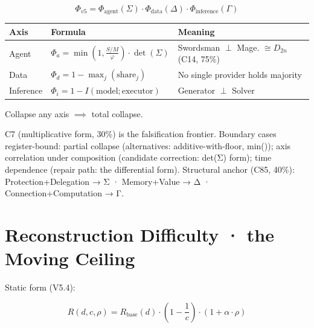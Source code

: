 \documentclass[
  11pt,
]{article}
\newcounter{none} %
\begin{document}
\[\Phi_{v5} = \Phi_{\text{agent}}(\Sigma) \cdot \Phi_{\text{data}}(\Delta) \cdot \Phi_{\text{inference}}(\Gamma)\]

{\def\LTcaptype{none} %
\begin{longtable}[]{@{}
  >{\raggedright\arraybackslash}p{}
  >{\raggedright\arraybackslash}p{}
  >{\raggedright\arraybackslash}p{}@{}}
\toprule\noalign{}
\begin{minipage}[b]{\linewidth}\raggedright
Axis
\end{minipage} & \begin{minipage}[b]{\linewidth}\raggedright
Formula
\end{minipage} & \begin{minipage}[b]{\linewidth}\raggedright
Meaning
\end{minipage} \\
\midrule\noalign{}
\endhead
\bottomrule\noalign{}
\endlastfoot
Agent & \(\Phi_a = \min(1, \frac{S/M}{\varphi}) \cdot \det(\Sigma)\) &
Swordsman \(\perp\) Mage. \(\cong D_{2n}\) (C14, 75\%) \\
Data & \(\Phi_d = 1 - \max_j(\text{share}_j)\) & No single provider
holds majority \\
Inference & \(\Phi_i = 1 - I(\text{model};\text{executor})\) & Generator
\(\perp\) Solver \\
\end{longtable}
}

Collapse any axis \(\implies\) total collapse.

C7 (multiplicative form, 30\%) is the falsification frontier. Boundary
cases register-bound: partial collapse (alternatives:
additive-with-floor, min()); axis correlation under composition
(candidate correction: det(Σ) form); time dependence (repair path: the
differential form). Structural anchor (C85, 40\%): Protection+Delegation
→ Σ · Memory+Value → Δ · Connection+Computation → Γ.

\section{Reconstruction Difficulty · the Moving
Ceiling}\label{reconstruction-difficulty-the-moving-ceiling}

Static form (V5.4):

\[R(d, c, \rho) = R_{\text{base}}(d) \cdot \left(1 - \frac{1}{c}\right) \cdot (1 + \alpha \cdot \rho)\]
\end{document}
